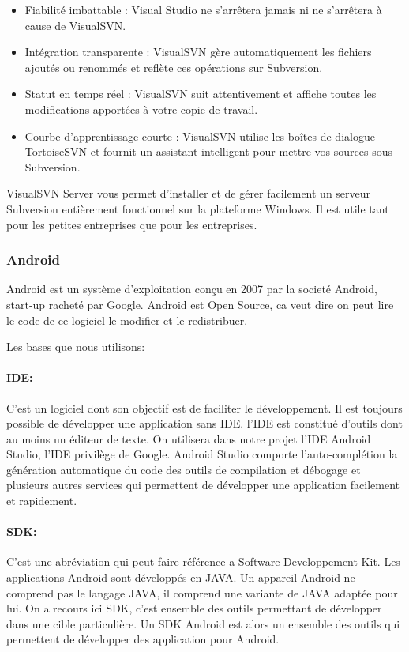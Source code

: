 \begin{itemize}
    \item Fiabilité imbattable : Visual Studio ne s'arrêtera jamais ni ne
        s'arrêtera à cause de VisualSVN.
    \item Intégration transparente : VisualSVN gère automatiquement les fichiers
        ajoutés ou renommés et reflète ces opérations sur Subversion.
    \item Statut en temps réel : VisualSVN suit attentivement et affiche toutes
        les modifications apportées à votre copie de travail.
    \item Courbe d'apprentissage courte : VisualSVN utilise les boîtes de
        dialogue TortoiseSVN et fournit un assistant intelligent pour mettre
        vos sources sous Subversion.
\end{itemize}
VisualSVN Server vous permet d'installer et de gérer facilement un serveur
Subversion entièrement fonctionnel sur la plateforme Windows. Il est utile tant
pour les petites entreprises que pour les entreprises.

\subsubsection{Android}

Android est un système d'exploitation conçu en 2007 par la societé Android,
start-up racheté par Google. Android est Open Source, ca veut dire on peut lire
le code de ce logiciel le modifier et le redistribuer.

Les bases que nous utilisons:
\paragraph{IDE:}

C'est un logiciel dont son objectif est de faciliter le développement. Il est
toujours possible de développer une application sans IDE.
l'IDE est constitué d'outils dont au moins un éditeur de texte.
On utilisera dans notre projet l'IDE Android Studio, l'IDE privilège de Google.
Android Studio comporte l'auto-complétion la génération automatique du code des
outils de compilation et débogage et plusieurs autres services qui permettent de
développer une application facilement et rapidement.

\paragraph{SDK:}

C'est une abréviation qui peut faire référence a Software Developpement Kit.
Les applications Android sont développés en JAVA. Un appareil Android ne
comprend pas le langage JAVA, il comprend une variante de JAVA adaptée pour lui.
On a recours ici SDK, c'est ensemble des outils permettant de développer dans
une cible particulière. Un SDK Android est alors un ensemble des outils qui
permettent de développer des application pour Android.


